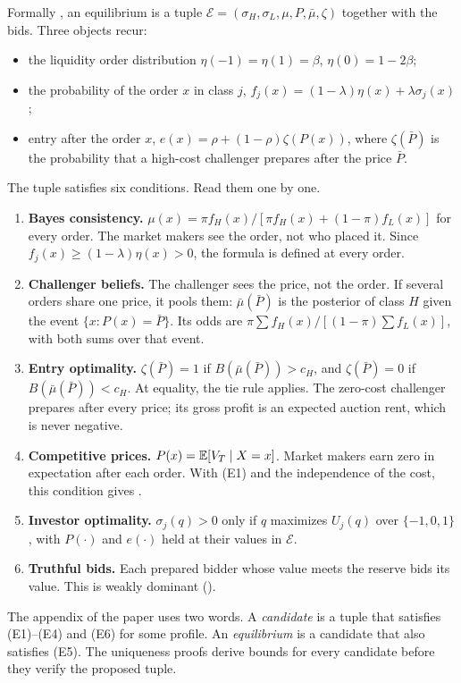 Formally , an equilibrium is a tuple \(\mathcal E=(\sigma_H,\sigma_L,\mu,P,\bar\mu,\zeta)\)
together with the bids. Three objects recur:
\begin{itemize}
\item the liquidity order distribution \(\eta(-1)=\eta(1)=\beta\), \(\eta(0)=1-2\beta\);
\item the probability of the order \(x\) in class \(j\), \(f_j(x)=(1-\lambda)\eta(x)+\lambda\sigma_j(x)\);
\item entry after the order \(x\), \(e(x)=\rho+(1-\rho)\zeta(P(x))\), where \(\zeta(\bar P)\) is the
probability that a high-cost challenger prepares after the price \(\bar P\).
\end{itemize}
The tuple satisfies six conditions. Read them one by one.
\begin{enumerate}[label=(E\arabic*),leftmargin=3em]
\item \textbf{Bayes consistency.} \(\mu(x)=\pi f_H(x)/[\pi f_H(x)+(1-\pi)f_L(x)]\) for every order. The
market makers see the order, not who placed it. Since \(f_j(x)\ge(1-\lambda)\eta(x)>0\), the formula is
defined at every order.
\item \textbf{Challenger beliefs.} The challenger sees the price, not the order. If several orders share
one price, it pools them: \(\bar\mu(\bar P)\) is the posterior of class \(H\) given the event
\(\{x:P(x)=\bar P\}\). Its odds are \(\pi\sum f_H(x)/[(1-\pi)\sum f_L(x)]\), with both sums over that
event.
\item \textbf{Entry optimality.} \(\zeta(\bar P)=1\) if \(B(\bar\mu(\bar P))>c_H\), and \(\zeta(\bar P)=0\)
if \(B(\bar\mu(\bar P))<c_H\). At equality, the tie rule applies. The zero-cost challenger prepares after
every price; its gross profit is an expected auction rent, which is never negative.
\item \textbf{Competitive prices.} \(P(x)=\mathbb{E}[V_T\mid X=x]\). Market makers earn zero in expectation after
each order. With (E1) and the independence of the cost, this condition gives .
\item \textbf{Investor optimality.} \(\sigma_j(q)>0\) only if \(q\) maximizes \(U_j(q)\) over
\(\{-1,0,1\}\), with \(P(\cdot)\) and \(e(\cdot)\) held at their values in \(\mathcal E\).
\item \textbf{Truthful bids.} Each prepared bidder whose value meets the reserve bids its value. This is
weakly dominant ().
\end{enumerate}
The appendix of the paper uses two words. A \emph{candidate} is a tuple that satisfies (E1)--(E4) and (E6)
for some profile. An \emph{equilibrium} is a candidate that also satisfies (E5). The uniqueness proofs derive bounds for every candidate before they verify the proposed tuple.

